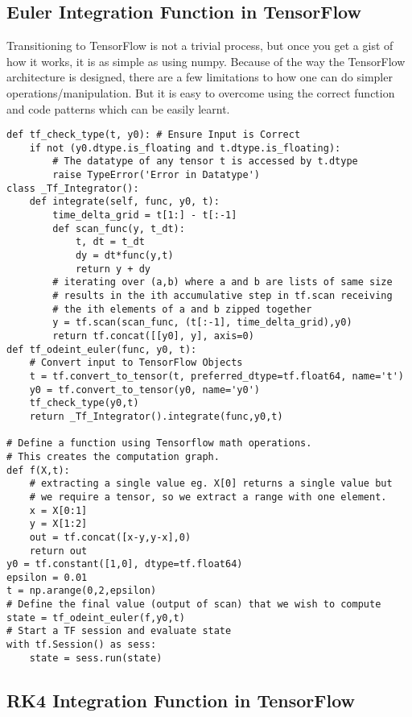 \documentclass[10pt,letterpaper]{article}
\begin{document}
\subsection*{Euler Integration Function in TensorFlow}

Transitioning to TensorFlow is not a trivial process, but once you get a gist of how it works, it is as simple as using numpy. Because of the way the TensorFlow architecture is designed, there are a few limitations to how one can do simpler operations/manipulation. But it is easy to overcome using the correct function and code patterns which can be easily learnt.

\begin{verbatim}
def tf_check_type(t, y0): # Ensure Input is Correct
    if not (y0.dtype.is_floating and t.dtype.is_floating): 
        # The datatype of any tensor t is accessed by t.dtype
        raise TypeError('Error in Datatype')
class _Tf_Integrator():
    def integrate(self, func, y0, t): 
        time_delta_grid = t[1:] - t[:-1]  
        def scan_func(y, t_dt): 
            t, dt = t_dt
            dy = dt*func(y,t)
            return y + dy
        # iterating over (a,b) where a and b are lists of same size
        # results in the ith accumulative step in tf.scan receiving
        # the ith elements of a and b zipped together
        y = tf.scan(scan_func, (t[:-1], time_delta_grid),y0) 
        return tf.concat([[y0], y], axis=0)
def tf_odeint_euler(func, y0, t):
    # Convert input to TensorFlow Objects
    t = tf.convert_to_tensor(t, preferred_dtype=tf.float64, name='t')
    y0 = tf.convert_to_tensor(y0, name='y0')
    tf_check_type(y0,t)
    return _Tf_Integrator().integrate(func,y0,t)
    
# Define a function using Tensorflow math operations. 
# This creates the computation graph.
def f(X,t):
    # extracting a single value eg. X[0] returns a single value but
    # we require a tensor, so we extract a range with one element.
    x = X[0:1] 
    y = X[1:2]
    out = tf.concat([x-y,y-x],0)
    return out
y0 = tf.constant([1,0], dtype=tf.float64)
epsilon = 0.01
t = np.arange(0,2,epsilon)
# Define the final value (output of scan) that we wish to compute
state = tf_odeint_euler(f,y0,t)
# Start a TF session and evaluate state
with tf.Session() as sess:
    state = sess.run(state)
\end{verbatim}

\subsection*{RK4 Integration Function in TensorFlow}
\end{document}
